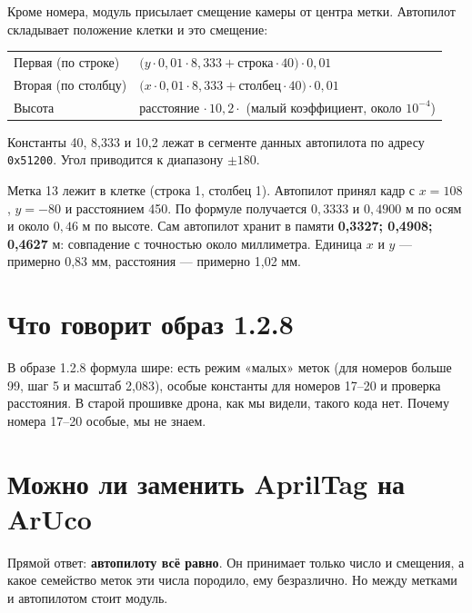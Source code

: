 Кроме номера, модуль присылает смещение камеры от центра метки. Автопилот складывает положение клетки и это смещение:

\begin{tabularx}{\textwidth}{@{}l Y@{}}
\toprule
{} &  \\ \midrule
Первая (по строке) & $\bigl(y \cdot 0{,}01 \cdot 8{,}333 + \text{строка} \cdot 40\bigr) \cdot 0{,}01$ \\
Вторая (по столбцу) & $\bigl(x \cdot 0{,}01 \cdot 8{,}333 + \text{столбец} \cdot 40\bigr) \cdot 0{,}01$ \\
Высота & расстояние $\cdot\, 10{,}2 \cdot$ (малый коэффициент, около $10^{-4}$) \\ \bottomrule
\end{tabularx}

\vspace{4pt}
\pr{} Константы 40, 8,333 и 10,2 лежат в сегменте данных автопилота по адресу \texttt{0x51200}. Угол приводится к диапазону $\pm 180$\textdegree.

\begin{zametka}
Метка 13 лежит в клетке (строка 1, столбец 1). Автопилот принял кадр с $x = 108$, $y = -80$ и расстоянием 450. По формуле получается $0{,}3333$ и $0{,}4900$ м по осям и около $0{,}46$ м по высоте. Сам автопилот хранит в памяти \textbf{0,3327; 0,4908; 0,4627} м: совпадение с точностью около миллиметра. Единица $x$ и $y$ --- примерно 0,83 мм, расстояния --- примерно 1,02 мм. \pr{}
\end{zametka}

\section{Что говорит образ 1.2.8}

В образе 1.2.8 формула шире: есть режим «малых» меток (для номеров больше 99, шаг 5 и масштаб 2,083), особые константы для номеров 17--20 и проверка расстояния. В старой прошивке дрона, как мы видели, такого кода нет. \pr{} Почему номера 17--20 особые, мы не знаем. \nei{}

\section{Можно ли заменить AprilTag на ArUco}

Прямой ответ: \textbf{автопилоту всё равно}. Он принимает только число и смещения, а какое семейство меток эти числа породило, ему безразлично. Но между метками и автопилотом стоит модуль.

